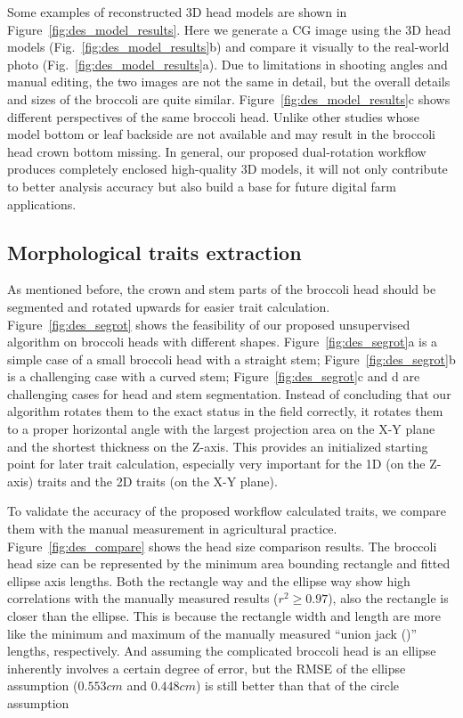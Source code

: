 

Some examples of reconstructed 3D head models are shown in Figure~\ref{fig:des_model_results}. Here we generate a CG image using the 3D head models (Fig.~\ref{fig:des_model_results}b) and compare it visually to the real-world photo (Fig.~\ref{fig:des_model_results}a). Due to limitations in shooting angles and manual editing, the two images are not the same in detail, but the overall details and sizes of the broccoli are quite similar. Figure~\ref{fig:des_model_results}c shows different perspectives of the same broccoli head. Unlike other studies whose model bottom \citep{kochi_3d_2018} or leaf backside \citep{cao_quantifying_2019} are not available and may result in the broccoli head crown bottom missing. In general, our proposed dual-rotation workflow produces completely enclosed high-quality 3D models, it will not only contribute to better analysis accuracy but also build a base for future digital farm applications.



\subsection{Morphological traits extraction}

As mentioned before, the crown and stem parts of the broccoli head should be segmented and rotated upwards for easier trait calculation. Figure~\ref{fig:des_segrot} shows the feasibility of our proposed unsupervised algorithm on broccoli heads with different shapes. Figure~\ref{fig:des_segrot}a is a simple case of a small broccoli head with a straight stem; Figure~\ref{fig:des_segrot}b is a challenging case with a curved stem;  Figure~\ref{fig:des_segrot}c and d are challenging cases for head and stem segmentation. Instead of concluding that our algorithm rotates them to the exact status in the field correctly, it rotates them to a proper horizontal angle with the largest projection area on the X-Y plane and the shortest thickness on the Z-axis. This provides an initialized starting point for later trait calculation, especially very important for the 1D (on the Z-axis) traits and the 2D traits (on the X-Y plane).



To validate the accuracy of the proposed workflow calculated traits, we compare them with the manual measurement in agricultural practice. Figure~\ref{fig:des_compare} shows the head size comparison results. The broccoli head size can be represented by the minimum area bounding rectangle and fitted ellipse axis lengths. Both the rectangle way and the ellipse way show high correlations with the manually measured results ($r^2\geq0.97$), also the rectangle is closer than the ellipse. This is because the rectangle width and length are more like the minimum and maximum of the manually measured ``union jack ()'' lengths, respectively. And assuming the complicated broccoli head is an ellipse inherently involves a certain degree of error, but the RMSE of the ellipse assumption ($0.553 cm$ and $0.448 cm$) is still better than that of the circle assumption \citep[Table 5, RMSE$=0.97 cm$]{blok_image_2021}

